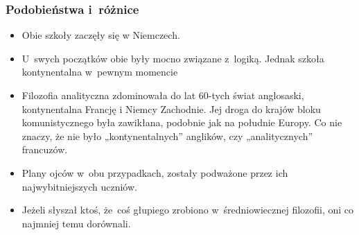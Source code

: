 \documentclass[10pt,t]{beamer}
\begin{document}
\begin{frame}
  \frametitle{Podobieństwa i~różnice}


  \begin{itemize}
    \RaggedRight

  \item Obie szkoły zaczęły się w Niemczech.

  \item U~swych początków obie były mocno związane z~logiką. Jednak
    szkoła kontynentalna w~pewnym momencie

  \item Filozofia analityczna zdominowała do lat 60-tych świat
    anglosaski, kontynentalna Francję i Niemcy Zachodnie. Jej droga do
    krajów bloku komunistycznego była zawikłana, podobnie jak na
    południe Europy. Co nie znaczy, że nie było „kontynentalnych”
    anglików, czy „analitycznych” francuzów.

  \item Plany ojców w~obu przypadkach, zostały podważone przez ich
    najwybitniejszych uczniów.

  \item Jeżeli słyszał ktoś, że~coś głupiego zrobiono
    w~średniowiecznej filozofii, oni co najmniej temu dorównali.

  \end{itemize}

\end{frame}
\end{document}
